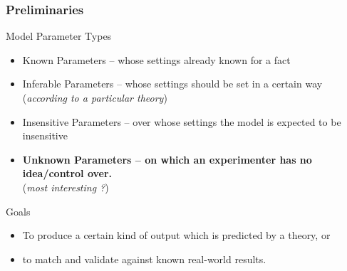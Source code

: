 \documentclass{beamer}
\begin{document}
\begin{frame}
	\frametitle{Preliminaries}
	\begin{block}{Model Parameter Types}
		\begin{footnotesize}
			\begin{itemize}
				\item Known Parameters -- whose settings already known for a fact
				\item Inferable Parameters -- whose settings should be set in a certain way \\(\emph{according to a particular theory})
				\item Insensitive Parameters -- over whose settings the model is expected to be insensitive
				\item \textbf{Unknown Parameters -- on which an experimenter has no idea/control over.}\\ (\emph{most interesting ?})
			\end{itemize}
		\end{footnotesize}
	\end{block}
	\vspace{-10pt}
	\begin{block}{Goals}
		\begin{footnotesize}
			\begin{itemize}
				\item To produce a certain kind of output which is predicted by a theory, or 
				\item to match and validate against known real-world results.
			\end{itemize}
		\end{footnotesize}
	\end{block}
\end{frame}
\end{document}
